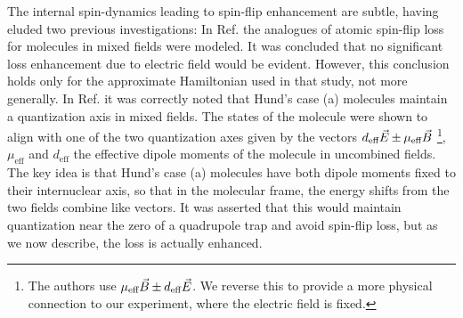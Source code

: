 \documentclass[%
 reprint,
 amsmath,amssymb,
 aps,
prl,
]{revtex4-1}
\newcommand{\s}{{\nobreak\hspace{.2em}}}
\begin{document}
The internal spin-dynamics leading to spin-flip enhancement are subtle, having eluded two previous investigations:
In Ref.\s\cite{Lara2008} the analogues of atomic spin-flip loss for molecules in mixed fields were modeled. %
It was concluded that no significant loss enhancement due to electric field would be evident. However, this conclusion holds only for the approximate Hamiltonian used in that study, not more generally. In Ref.\s\cite{Bohn2013} it was correctly noted that Hund's case (a) molecules maintain a quantization axis in mixed fields.
The states of the molecule were shown to align with one of the two quantization axes given by the vectors $d_\text{eff}\vec{E} \s {\pm}\s  \mu_\text{eff}\vec{B}$
\s\footnote{The authors use $\mu_\text{eff}\vec{B} \s {\pm}\s  d_\text{eff}\vec{E}$. We reverse this to provide a more physical connection to our experiment, where the electric field is fixed.},
$\mu_\text{eff}$ and $d_\text{eff}$ the effective dipole moments of the molecule in uncombined fields.
The key idea is that Hund's case (a) molecules have both dipole moments fixed to their internuclear axis, so that in the molecular frame, the energy shifts from the two fields combine like vectors.
It was asserted that this would maintain quantization near the zero of a quadrupole trap and avoid spin-flip loss, but as we now describe, the loss is actually enhanced.

\end{document}
